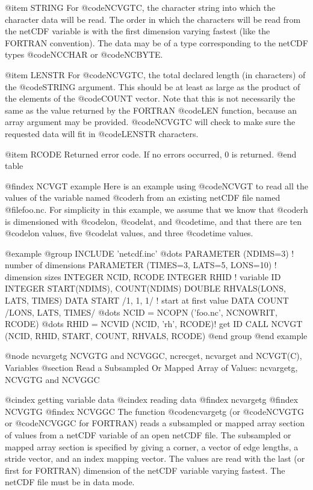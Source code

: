 @item STRING
For @code{NCVGTC}, the character string into which the character data
will be read.  The order in which the characters will be read from the
netCDF variable is with the first dimension
varying fastest (like the FORTRAN convention).  The data may be of a
type corresponding to the netCDF types @code{NCCHAR} or @code{NCBYTE}.

@item LENSTR
For @code{NCVGTC}, the total declared length (in characters) of the
@code{STRING} argument.  This should be at least as large as the product
of the elements of the @code{COUNT} vector.  Note that this is not
necessarily the same as the value returned by the FORTRAN @code{LEN}
function, because an array argument may be provided.  @code{NCVGTC} will
check to make sure the requested data will fit in @code{LENSTR}
characters.

@item RCODE
Returned error code.  If no errors occurred, 0 is returned.
@end table

@findex NCVGT example
Here is an example using @code{NCVGT} to read all the values of the
variable named @code{rh} from an existing netCDF file named
@file{foo.nc}.  For simplicity in this example, we assume that we know
that @code{rh} is dimensioned with @code{lon}, @code{lat}, and
@code{time}, and that there are ten @code{lon} values, five @code{lat}
values, and three @code{time} values.

@example
@group
      INCLUDE 'netcdf.inc'
         @dots{}
      PARAMETER (NDIMS=3) ! number of dimensions
      PARAMETER (TIMES=3, LATS=5, LONS=10) ! dimension sizes
      INTEGER NCID, RCODE
      INTEGER RHID ! variable ID
      INTEGER START(NDIMS), COUNT(NDIMS)
      DOUBLE RHVALS(LONS, LATS, TIMES)
      DATA START /1, 1, 1/ ! start at first value
      DATA COUNT /LONS, LATS, TIMES/
         @dots{}
      NCID = NCOPN ('foo.nc', NCNOWRIT, RCODE)
         @dots{}
      RHID = NCVID (NCID, 'rh', RCODE)! get ID
      CALL NCVGT (NCID, RHID, START, COUNT, RHVALS, RCODE)
@end group
@end example

@node ncvargetg NCVGTG and NCVGGC, ncrecget, ncvarget and NCVGT(C), Variables
@section Read a Subsampled Or Mapped Array of Values:  ncvargetg, NCVGTG and NCVGGC

@cindex getting variable data
@cindex reading data
@findex ncvargetg
@findex NCVGTG
@findex NCVGGC
The function @code{ncvargetg} (or @code{NCVGTG} or @code{NCVGGC} for
FORTRAN) reads a subsampled or mapped array section of values from a netCDF variable
of an open netCDF file.  The subsampled or mapped array
section is specified by
giving a corner, a vector of edge lengths, a stride vector, and an index
mapping vector.  The values are read with the last (or first for
FORTRAN) dimension of the netCDF variable varying fastest.  The
netCDF file must be in data mode.

